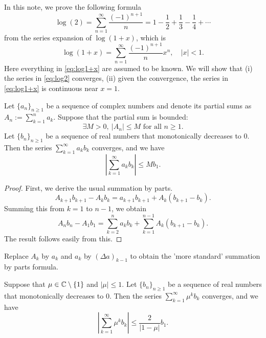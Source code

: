 \documentclass{article}
\begin{document}
\self

In this note, we prove the following formula
\begin{equation}\label{eq:log2}
    \log(2) = \sum_{n=1}^\infty \frac{(-1)^{n+1}}{n} = 1 - \frac{1}{2} + \frac{1}{3} - \frac{1}{4} + \cdots
\end{equation}
from the series expansion of $\log(1+x)$, which is
\begin{equation}\label{eq:log1+x}
    \log(1+x) = \sum_{n=1}^\infty \frac{(-1)^{n+1}}{n} x^n,\quad \vert x\vert < 1.
\end{equation}
Here everything in \eqref{eq:log1+x} are assumed to be known. We will show that (i) the series in \eqref{eq:log2} converges, (ii) given the convergence, the series in \eqref{eq:log1+x} is continuous near $x=1$.

\begin{proposition}
    Let $\{a_n\}_{n\geq 1}$ be a sequence of complex numbers and denote its partial sums as $A_n:=\sum_{k=1}^n a_k$. Suppose that the partial sum is bounded:
    \[
        \exists M>0,\ \vert A_n\vert \leq M \text{ for all } n\geq 1.
    \]
    Let $\{b_n\}_{n\geq 1}$ be a sequence of real numbers that monotonically decreases to $0$. Then the series $\sum_{k=1}^\infty a_k b_k$ converges, and we have
    \[
        \left\vert \sum_{k=1}^\infty a_kb_k \right\vert \leq Mb_1.
    \]
\end{proposition}

\begin{proof}
    First, we derive the usual summation by parts. 
    \[
        A_{k+1}b_{k+1}-A_kb_k = a_{k+1}b_{k+1}+A_k(b_{k+1}-b_k).
    \]
    Summing this from $k=1$ to $n-1$, we obtain
    \[
        A_{n}b_{n} - A_1b_1 = \sum_{k=2}^{n} a_{k}b_{k} + \sum_{k=1}^{n-1} A_k(b_{k+1}-b_k).
    \]
    The result follows easily from this.
\end{proof}

\begin{remark}
    Replace $A_k$ by $a_k$ and $a_k$ by $(\Delta a)_{k-1}$ to obtain the 'more standard' summation by parts formula.
\end{remark}

\begin{corollary}\label{cor}
    Suppose that $\mu\in\mathbb{C}\setminus\{1\}$ and $\vert \mu\vert \leq 1$. Let $\{b_n\}_{n\geq 1}$ be a sequence of real numbers that monotonically decreases to $0$. Then the series $\sum_{k=1}^\infty \mu^{k} b_k$ converges, and we have
    \[
        \left\vert \sum_{k=1}^\infty \mu^{k} b_k \right\vert \leq \frac{2}{\vert 1-\mu \vert} b_1.
    \]
\end{corollary}
\end{document}

